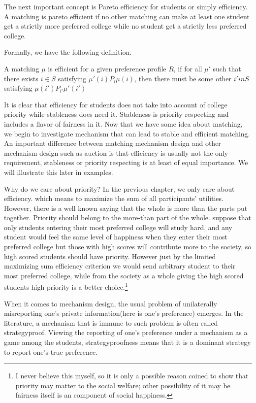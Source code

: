 The next important concept is Pareto efficiency for students or simply
efficiency. A matching is pareto efficient if no other matching can
make at least one student get a strictly more preferred college while
no student get a strictly less preferred college. 

Formally, we have the following definition.
\begin{definition}
A matching $\mu$ is efficient for a given preference profile $R$, if
for all $\mu'$ such that there exists $i \in S$ satisfying $\mu'(i)
P_i \mu(i)$, then there must be some other $i' in S$ satisfying
$\mu(i') P_{i'} \mu'(i')$
\end{definition}

It is clear that efficiency for students does not take into account of college priority while stableness does need it. Stableness is priority respecting and includes a flavor of fairness in it. Now that we have some idea about matching, we begin to investigate mechanism that can lead to stable and efficient matching. An important difference between matching mechanism design and other mechanism design such as auction is that efficiency is usually not the only requirement, stableness or priority respecting is at least of equal importance. We will illustrate this later in examples.

Why do we care about priority? In the previous chapter, we only care about efficiency. which means to maximize the sum of all participants' utilities. However, there is a well known saying that the whole is more than the parts put together. Priority should belong to the more-than part of the whole. suppose that only students entering their most preferred college will study hard, and any student would feel the same level of happiness when they enter their most preferred college but those with high scores will contribute more to the society, so high scored students should have priority. However just by the limited maximizing sum efficiency criterion we would send arbitrary student to their most preferred college, while from the society as a whole giving the high scored students high priority is a better choice.\footnote{I never believe this myself, so it is only a possible reason coined to show that priority may matter to the social welfare; other possibility of it may be fairness itself is an component of social happiness.}

When it comes to mechanism design, the usual problem of unilaterally misreporting one's private information(here is one's preference) emerges. In the literature, a mechanism that is immune to such problem is often called strategyproof. Viewing the reporting of one's preference under a mechanism as a game among the students, strategyproofness  means that it is a dominant strategy to report one's true preference. 

